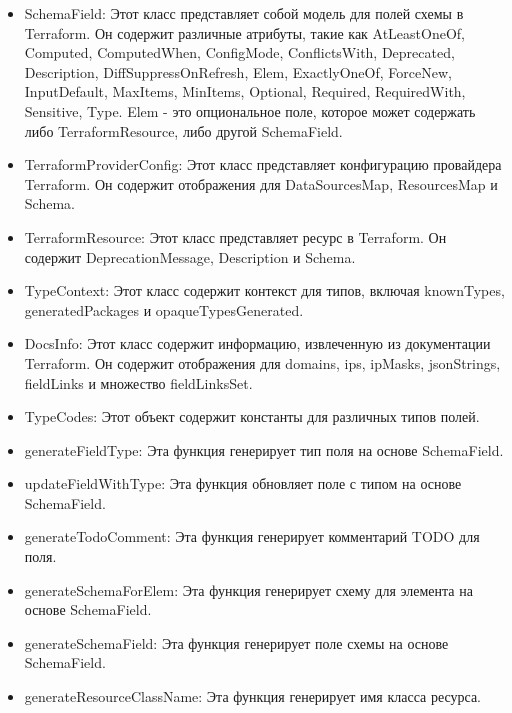 \begin{itemize}
  \item SchemaField: Этот класс представляет собой модель для полей схемы в
Terraform. Он содержит различные атрибуты, такие как AtLeastOneOf, Computed,
ComputedWhen, ConfigMode, ConflictsWith, Deprecated, Description,
DiffSuppressOnRefresh, Elem, ExactlyOneOf, ForceNew, InputDefault, MaxItems,
MinItems, Optional, Required, RequiredWith, Sensitive, Type. Elem - это
опциональное поле, которое может содержать либо TerraformResource, либо другой
SchemaField.
  
  \item TerraformProviderConfig: Этот класс представляет конфигурацию провайдера
Terraform. Он содержит отображения для DataSourcesMap, ResourcesMap и Schema.
  
  \item TerraformResource: Этот класс представляет ресурс в Terraform. Он
содержит DeprecationMessage, Description и Schema.
  
  \item TypeContext: Этот класс содержит контекст для типов, включая knownTypes,
generatedPackages и opaqueTypesGenerated.
  
  \item DocsInfo: Этот класс содержит информацию, извлеченную из документации
Terraform. Он содержит отображения для domains, ips, ipMasks, jsonStrings,
fieldLinks и множество fieldLinksSet.
  
  \item TypeCodes: Этот объект содержит константы для различных типов полей.
  
  \item generateFieldType: Эта функция генерирует тип поля на основе
SchemaField.
  
  \item updateFieldWithType: Эта функция обновляет поле с типом на основе
SchemaField.
  
  \item generateTodoComment: Эта функция генерирует комментарий TODO для поля.
  
  \item generateSchemaForElem: Эта функция генерирует схему для элемента на
основе SchemaField.
  
  \item generateSchemaField: Эта функция генерирует поле схемы на основе
SchemaField.
  
  \item generateResourceClassName: Эта функция генерирует имя класса ресурса.
  

\end{itemize}
